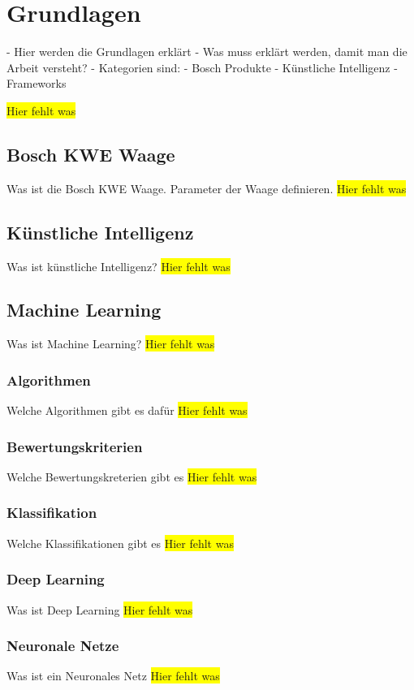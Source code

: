 \chapter{Grundlagen}
\label{ch:grundlagen}
- Hier werden die Grundlagen erklärt
- Was muss erklärt werden, damit man die Arbeit versteht?
- Kategorien sind:
- Bosch Produkte
- Künstliche Intelligenz
- Frameworks

\colorbox{yellow}{Hier fehlt was}

\section{Bosch KWE Waage}
Was ist die Bosch KWE Waage. Parameter der Waage definieren.
\colorbox{yellow}{Hier fehlt was}

\section{Künstliche Intelligenz}
Was ist künstliche Intelligenz?
\colorbox{yellow}{Hier fehlt was}

\section{Machine Learning}
Was ist Machine Learning?
\colorbox{yellow}{Hier fehlt was}

\subsection{Algorithmen}
Welche Algorithmen gibt es dafür
\colorbox{yellow}{Hier fehlt was}

\subsection{Bewertungskriterien}
Welche Bewertungskreterien gibt es
\colorbox{yellow}{Hier fehlt was}

\subsection{Klassifikation}
Welche Klassifikationen gibt es
\colorbox{yellow}{Hier fehlt was}

\subsection{Deep Learning}
Was ist Deep Learning
\colorbox{yellow}{Hier fehlt was}

\subsection{Neuronale Netze}
Was ist ein Neuronales Netz
\colorbox{yellow}{Hier fehlt was}

